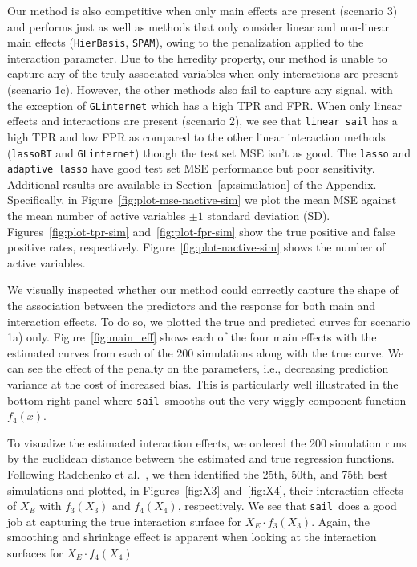 \documentclass[12pt,letter]{article}\usepackage[]{graphicx}\usepackage[]{color}
\newcommand{\sail}{\texttt{sail}}
\begin{document}
Our method is also competitive when only main effects are present (scenario 3) and performs just as well as methods that only consider linear and non-linear main effects (\texttt{HierBasis}, \texttt{SPAM}), owing to the penalization applied to the interaction parameter. Due to the heredity property, our method is unable to capture any of the truly associated variables when only interactions are present (scenario 1c). However, the other methods also fail to capture any signal, with the exception of \texttt{GLinternet} which has a high TPR and FPR. When only linear effects and interactions are present (scenario 2), we see that \texttt{linear sail} has a high TPR and low FPR as compared to the other linear interaction methods (\texttt{lassoBT} and \texttt{GLinternet}) though the test set MSE isn't as good. The \texttt{lasso} and \texttt{adaptive lasso} have good test set MSE performance but poor sensitivity. Additional results are available in Section~\ref{ap:simulation} of the Appendix. Specifically, in Figure~\ref{fig:plot-mse-nactive-sim} we plot the mean MSE against the mean number of active variables $\pm 1$ standard deviation (SD). Figures~\ref{fig:plot-tpr-sim} and~\ref{fig:plot-fpr-sim} show the true positive and false positive rates, respectively. Figure~\ref{fig:plot-nactive-sim} shows the number of active variables. 

We visually inspected whether our method could correctly capture the shape of the association between the predictors and the response for both main and interaction effects. To do so, we plotted the true and predicted curves for scenario 1a) only. Figure~\ref{fig:main_eff} shows each of the four main effects with the estimated curves from each of the 200 simulations along with the true curve. We can see the effect of the penalty on the parameters, i.e., decreasing prediction variance at the cost of increased bias. This is particularly well illustrated in the bottom right panel where \sail ~smooths out the very wiggly component function $f_4(x)$.

To visualize the estimated interaction effects, we ordered the 200 simulation runs by the euclidean distance between the estimated and true regression functions. Following Radchenko et al.~\citep{radchenko2010variable}, we then identified the 25th, 50th, and 75th best simulations and plotted, in Figures~\ref{fig:X3} and~\ref{fig:X4}, their interaction effects of $X_E$ with $f_3(X_3)$ and $f_4(X_4)$, respectively. We see that \sail ~does a good job at capturing the true interaction surface for $X_E \cdot f_3(X_3)$. Again, the smoothing and shrinkage effect is apparent when looking at the interaction surfaces for $X_E \cdot f_4(X_4)$
\end{document}
